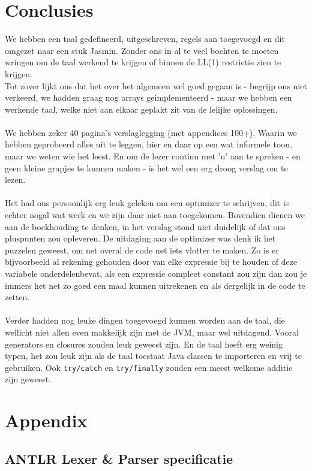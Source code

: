 \documentclass[]{article}
\begin{document}
\section{Conclusies}
We hebben een taal gedefineerd, uitgeschreven, regels aan toegevoegd en dit omgezet naar een stuk Jasmin. Zonder ons in al te veel bochten te moeten wringen om de taal werkend te krijgen of binnen de LL(1) restrictie zien te krijgen. \\ 
Tot zover lijkt ons dat het over het algemeen wel goed gegaan is - begrijp ons niet verkeerd, we hadden graag nog arrays geimplementeerd - maar we hebben een werkende taal, welke niet aan elkaar geplakt zit van de lelijke oplossingen. \\
\\
We hebben zeker 40 pagina's verslaglegging (met appendices 100+). Waarin we hebben geprobeerd alles uit te leggen, hier en daar op een wat informele toon, maar we weten wie het leest. En om de lezer continu met 'u' aan te spreken - en geen kleine grapjes te kunnen maken - is het wel een erg droog verslag om te lezen.\\
\\
Het had ons persoonlijk erg leuk geleken om een optimizer te schrijven, dit is echter nogal wat werk en we zijn daar niet aan toegekomen. Bovendien dienen we aan de boekhouding te denken, in het verslag stond niet duidelijk of dat ons pluspunten zou opleveren.
De uitdaging aan de optimizer was denk ik het puzzelen geweest, om net overal de code net iets vlotter te maken. Zo is er bijvoorbeeld al rekening gehouden door van elke expressie bij te houden of deze variabele onderdelenbevat, als een expressie compleet constant zou zijn dan zou je immers het net zo goed een maal kunnen uitrekenen en als dergelijk in de code te zetten.\\
\\
Verder hadden nog leuke dingen toegevoegd kunnen worden aan de taal, die wellicht niet allen even makkelijk zijn met de JVM, maar wel uitdagend. Vooral generators en closures zouden leuk geweest zijn. En de taal heeft erg weinig typen, het zou leuk zijn als de taal toestaat Java classen te importeren en vrij te gebruiken. Ook \texttt{try/catch} en \texttt{try/finally} zouden een meest welkome additie zijn geweest.

\newpage
\section{Appendix}

\subsection{ANTLR Lexer \& Parser specificatie}
\end{document}
